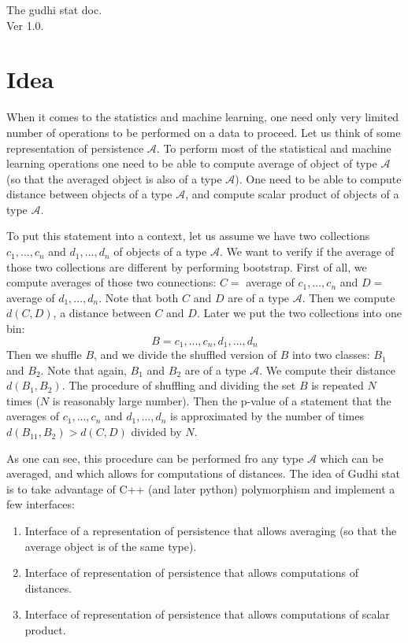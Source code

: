 \documentclass[11pt]{article}
\begin{document}
\begin{center}
\Huge{The gudhi stat doc.\\
Ver 1.0.}
\end{center}


\section{Idea}

When it comes to the statistics and machine learning, one need only very limited number of operations to be performed on a data to proceed. Let us think of some representation of persistence $\mathcal{A}$. To perform most of the statistical and machine learning operations one need to be able to compute average of object of type $\mathcal{A}$ (so that the averaged object is also of a type $\mathcal{A}$). One need to be able to compute distance between objects of a type $\mathcal{A}$, and compute scalar product of objects of a type $\mathcal{A}$.

To put this statement into a context, let us assume we have two collections $c_1,...,c_n$ and $d_1,...,d_n$ of objects of a type $\mathcal{A}$. We want to verify if the average of those two collections are different by performing bootstrap.
First of all, we compute averages of those two connections: $C =$ average of $c_1,...,c_n$ and $D =$ average of $d_1,...,d_n$. Note that both $C$ and $D$ are of a type $\mathcal{A}$. Then we compute $d(C,D)$, a distance between $C$ and $D$.
Later we put the two collections into one bin:\\
\[B = { c_1,...,c_n,d_1,...,d_n }\]
Then we shuffle $B$, and we divide the shuffled version of $B$ into two classes: $B_1$ and $B_2$. Note that again, $B_1$ and $B_2$ are of a type $\mathcal{A}$. We compute their distance $d(B_1,B_2)$. The procedure of shuffling and dividing the set $B$ is repeated $N$ times ($N$ is reasonably large number).
Then the p-value of a statement that the averages of  $c_1,...,c_n$ and $d_1,...,d_n$ is approximated by the number of times $d(B_11,B_2) > d(C,D)$ divided by $N$.

As one can see, this procedure can be performed fro any type $\mathcal{A}$ which can be averaged, and which allows for computations of distances. The idea of Gudhi stat is to take advantage of C++ (and later python) polymorphism and implement a few interfaces:
\begin{enumerate}
\item Interface of a representation of persistence that allows averaging (so that the average object is of the same type).
\item Interface of representation of persistence that allows computations of distances.
\item Interface of representation of persistence that allows computations of scalar product.
\end{enumerate}
\end{document}
